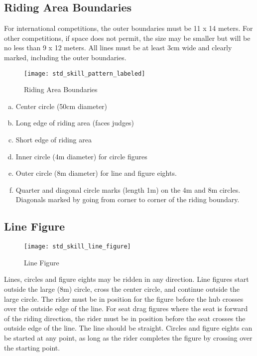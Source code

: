\subsection{Riding Area Boundaries \label{subsec:freestyle_floor-markings-figure-shapes_riding-area-boundaries}}
For international competitions, the outer boundaries must be 11 x 14 meters.
For other competitions, if space does not permit, the size may be smaller but will be no less than 9 x 12 meters.
All lines must be at least 3cm wide and clearly marked, including the outer boundaries.

\begin{figure}[h]
\begin{center}
\texttt{[image: std\_skill\_pattern\_labeled]}
\end{center}
\vspace{-20pt}
\caption{Riding Area Boundaries \label{fig:std_skill_pattern_labeled}}
\vspace{-10pt}
\end{figure}

\begin{enumerate}[a.]
\item Center circle (50cm diameter)
\item Long edge of riding area (faces judges)
\item Short edge of riding area
\item Inner circle (4m diameter) for circle figures
\item Outer circle (8m diameter) for line and figure eights.
\item Quarter and diagonal circle marks (length 1m) on the 4m and 8m circles.
Diagonals marked by going from corner to corner of the riding boundary.
\end{enumerate}


\subsection{Line Figure}
\begin{wrapfigure}{r}{0.35\textwidth}
\vspace{-35pt}
\begin{center}
\texttt{[image: std\_skill\_line\_figure]}
\end{center}
\vspace{-20pt}
\caption{Line Figure\label{fig:std_skill_line_figure}}
\vspace{-10pt}
\end{wrapfigure}
Lines, circles and figure eights may be ridden in any direction.
Line figures start outside the large (8m) circle, cross the center circle, and continue outside the large circle.
The rider must be in position for the figure before the hub crosses over the outside edge of the line.
For seat drag figures where the seat is forward of the riding direction, the rider must be in position before the seat crosses the outside edge of the line.
The line should be straight.
Circles and figure eights can be started at any point, as long as the rider completes the figure by crossing over the starting point.

